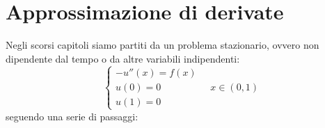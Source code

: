 \chapter{Approssimazione di derivate}

Negli scorsi capitoli siamo partiti da un problema stazionario, ovvero non dipendente dal tempo o da altre variabili indipendenti:
\begin{equation*}
\begin{cases}
-u''(x) =f(x)\\
u(0) =0\\
u(1) =0
\end{cases} \quad x\in ( 0,1)
\end{equation*}
seguendo una serie di passaggi:

\begin{figure}[htpb]
	\centering

	\begin{tikzpicture}[x=0.75pt,y=0.75pt,yscale=-1,xscale=1]



\end{tikzpicture}
\end{figure}
